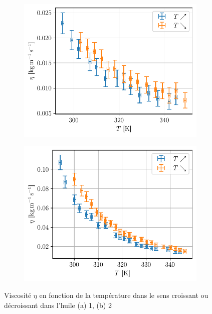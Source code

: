 \begin{figure}[h]
    \centering
    \begin{subfigure}{0.48\linewidth}
        \centering
        \includegraphics[width=\linewidth]{figures/huile1_eta.pdf}
        \caption{}
        \label{fig:huile1_eta}
    \end{subfigure}
    \begin{subfigure}{0.48\linewidth}
        \centering
        \includegraphics[width=\linewidth]{figures/huile2_eta.pdf}
        \caption{}
        \label{fig:huile2_eta}
    \end{subfigure}
    \caption{Viscosité \(\eta\) en fonction de la température dans le sens croissant ou décroissant dans l'huile (a) 1, (b) 2}
\end{figure}

